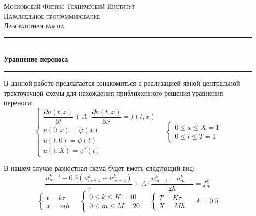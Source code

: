 \documentclass[12pt, a4paper, final]{article}
\begin{document}
\begin{center}

    \textsc{\LARGE Московский Физико-Технический Институт}\\[1,5cm]
    \textsc{\Large Параллельное программирование}\\[0,5cm]
    \textsc{\large Лабораторная работа }\\[1cm]

    \noindent\rule{\textwidth}{1pt}
    \\[0.5cm]
    { \huge \bfseries Уравнение переноса}
    \\[0.1cm]
    \noindent\rule{\textwidth}{1pt}
\end{center}

\vspace{1cm}

В данной работе предлагается ознакомиться с реализацией явной центральной трехточечной схемы для нахождения приближенного решения уравнения переноса:
\begin{equation*}
\begin{cases}
\dfrac{\partial u(t,x)}{\partial t} + A \cdot \dfrac{\partial u(t, x)}{\partial x} = f(t, x)\\
u(0, x) = \varphi(x)\\
u(t, 0) = \psi(t)\\
u(t, X) = \psi'(t)
\end{cases}
~~~~~
\begin{cases}
0 \leq x \leq X = 1\\
0 \leq t \leq T = 1
\end{cases}
\end{equation*}

В нашем случае разностная схема будет иметь следующий вид:
\begin{equation*}
\dfrac{u_m^{k+1} - 0.5 (u_{m + 1}^k + u_{m - 1}^k)}{\tau} + A \cdot \dfrac{u_{m + 1}^k - u_{m - 1}^k}{2h} = f_m^k
\end{equation*}
\begin{equation*}
\begin{cases}
t = k \tau\\
x = m h
\end{cases}
~~~~~
\begin{cases}
0 \leq k \leq K = 40\\
0 \leq m \leq M = 20
\end{cases}
~~~~~
\begin{cases}
T = K \tau\\
X = M h
\end{cases}
~~~~~
A = 0.5
\end{equation*}
\end{document}
